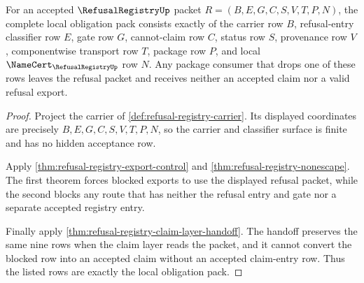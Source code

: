 \begin{theorem}
\label{thm:refusal-registry-obligation-pack}
For an accepted $\RefusalRegistryUp$ packet $R=(B,E,G,C,S,V,T,P,N)$, the complete local obligation pack consists exactly of the carrier row $B$, refusal-entry classifier row $E$, gate row $G$, cannot-claim row $C$, status row $S$, provenance row $V$, componentwise transport row $T$, package row $P$, and local $\NameCert_{\RefusalRegistryUp}$ row $N$. Any package consumer that drops one of these rows leaves the refusal packet and receives neither an accepted claim nor a valid refusal export.
\end{theorem}
\begin{proof}
Project the carrier of \autoref{def:refusal-registry-carrier}. Its displayed coordinates are precisely $B,E,G,C,S,V,T,P,N$, so the carrier and classifier surface is finite and has no hidden acceptance row.

Apply \autoref{thm:refusal-registry-export-control} and \autoref{thm:refusal-registry-nonescape}. The first theorem forces blocked exports to use the displayed refusal packet, while the second blocks any route that has neither the refusal entry and gate nor a separate accepted registry entry.

Finally apply \autoref{thm:refusal-registry-claim-layer-handoff}. The handoff preserves the same nine rows when the claim layer reads the packet, and it cannot convert the blocked row into an accepted claim without an accepted claim-entry row. Thus the listed rows are exactly the local obligation pack.
\end{proof}

